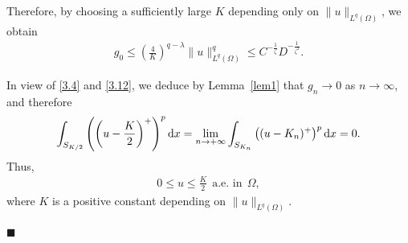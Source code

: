 \documentclass[onecolumn]{autart}
\newenvironment{proof}{{\it Proof: \enspace}}{\hfill $\blacksquare$\par}
\begin{document}
\begin{proof}
		Therefore, by choosing a sufficiently large $K$ depending only on $\|u\|_{L^{q}(\Omega)}$, we obtain
		\begin{align}
			g_0
			\leq
			\left(\frac{4}{K}\right)^{q-\lambda} \|u\|_{L^{q}(\Omega)}^{q}
			\leq
			C^{- \frac{1}{\zeta}} D^{- \frac{1}{\zeta^2}}.	\label{3.12}
		\end{align}
		
		In view of \eqref{3.4} and \eqref{3.12}, we deduce by  Lemma~\ref{lem1}  that $g_n \to 0$ as $n \to \infty$, and therefore
		\begin{align}
			\int_{S_{K/2}} \left( \left( u - \frac{K}{2} \right)^+ \right)^p   \mathrm{d}x= \lim_{n \to +\infty} \int_{S_{K_n}} \left( (u - K_n)^+ \right)^p  \mathrm{d}x=0.\notag
		\end{align}
		Thus,
		\begin{align}\label{3.32}
			0\leq u \leq \frac{K}{2} \ \     \text{a.e.\  in}\ \  \Omega,
		\end{align}
		where $K$ is a positive constant depending on $\| u \|_{L^{q}(\Omega)}$.
		

\end{proof}
\end{document}
